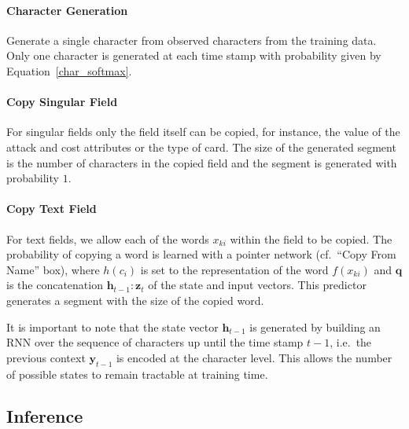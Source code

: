 \documentclass[11pt]{article}
\begin{document}
\paragraph{Character Generation} Generate a single character from observed
characters from the training data. Only one character is generated at each
time stamp with probability given by Equation~\ref{char_softmax}.

\paragraph{Copy Singular Field} For singular fields only the
field itself can be copied, for instance, the value of the attack and cost attributes
or the type of card. The size of the generated segment is the
number of characters in the copied field and
the segment is generated with probability $1$.

\paragraph{Copy Text Field} For text fields, we allow each of the words
$x_{ki}$ within the field to be copied. The probability of copying a word is learned with
a pointer network (cf.~``Copy From Name'' box), where $h(c_i)$ is set to
the representation of the word $f(x_{ki})$ and
$\mathbf{q}$ is the concatenation $\mathbf{h}_{t-1}:\mathbf{z}_t$ of the state and input vectors.
This predictor generates a segment with the size of the copied word.

It is important to note that the state vector $\mathbf{h}_{t-1}$ is
generated by building an RNN over the sequence of characters up until the
time stamp $t-1$, i.e.\ the previous context $\mathbf{y}_{t-1}$ is
encoded at the character level. This allows the number of possible states to remain
tractable at training time.

\subsection{Inference}
\end{document}
